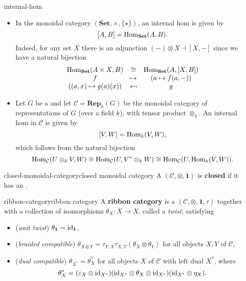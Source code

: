 \begin{example}{internal-hom}
    \begin{itemize}
        \item In the monoidal category $(\textbf{Set}, \times, \{ \star \})$, an internal hom is given by
        \[ [A, B] = \operatorname{Hom}_\textbf{Set}(A, B) . \]
        Indeed, for any set $X$ there is an adjunction $(-) \otimes X \dashv {[X, -]}$ since we have a natural bijection
        \[ \begin{array}{ccc}
            \operatorname{Hom}_\textbf{Set}(A \times X, B) & \cong & \operatorname{Hom}_\textbf{Set}(A, [X, B]) \\
            f & \mapsto & (a \mapsto f(a, -)) \\
            ((a, x) \mapsto g(a)(x)) & \mapsfrom & g
        \end{array} \]
        \item Let $G$ be a  and let $\mathcal{C} = \textbf{Rep}_k(G)$ be the monoidal category of representations of $G$ (over a field $k$), with tensor product $\otimes_k$. An internal hom in $\mathcal{C}$ is given by
        \[ [V, W] = \operatorname{Hom}_{k}(V, W) , \]
        which follows from the natural bijection
        \[ \operatorname{Hom}_\mathcal{C}(U \otimes_k V, W) \cong \operatorname{Hom}_\mathcal{C}(U, V^* \otimes_k W) \cong \operatorname{Hom}_\mathcal{C}(U, \operatorname{Hom}_k(V, W)) . \]
    \end{itemize}
\end{example}

\begin{topic}{closed-monoidal-category}{closed monoidal category}
    A   $(\mathcal{C}, \otimes, \textbf{1})$ is \textbf{closed} if it has an .
\end{topic}

\begin{topic}{ribbon-category}{ribbon category}
    A \textbf{ribbon category} is a   $(\mathcal{C}, \otimes, \textbf{1}, \tau)$ together with a collection of isomorphisms $\theta_X : X \to X$, called a \textit{twist}, satisfying
    \begin{itemize}
        \item (\textit{unit twist}) $\theta_\textbf{1} = \textup{id}_\textbf{1}$,
        \item (\textit{braided compatible}) $\theta_{X \otimes Y} = \tau_{Y, X} \tau_{X, Y} (\theta_X \otimes \theta_Y)$ for all objects $X, Y$ of $\mathcal{C}$,
        \item (\textit{dual compatible}) $\theta_{X^*} = \theta_X^*$ for all objects $X$ of $\mathcal{C}$ with left dual $X^*$, where
        \[ \theta_X^* = (\varepsilon_X \otimes \textup{id}_{X^*}) (\textup{id}_{X^*} \otimes \theta_X \otimes \textup{id}_{X^*}) (\textup{id}_{X^*} \otimes \eta_X) . \]
    \end{itemize}
\end{topic}

